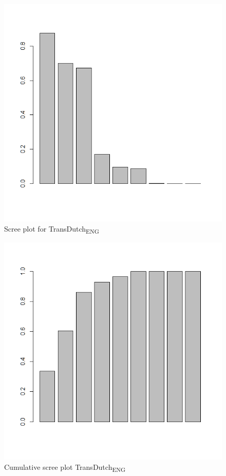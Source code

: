\begin{figure}
\includegraphics[height=.3\textheight]{figures/Vandevoorde2-img22.png}
\caption{\label{fig:key:22}  Scree plot for TransDutch\textsubscript{ENG}}
\end{figure}

\begin{figure}
\includegraphics[height=.3\textheight]{figures/Vandevoorde2-img23.png}
\caption{\label{fig:key:23}  Cumulative scree plot TransDutch\textsubscript{ENG}}
\end{figure}

